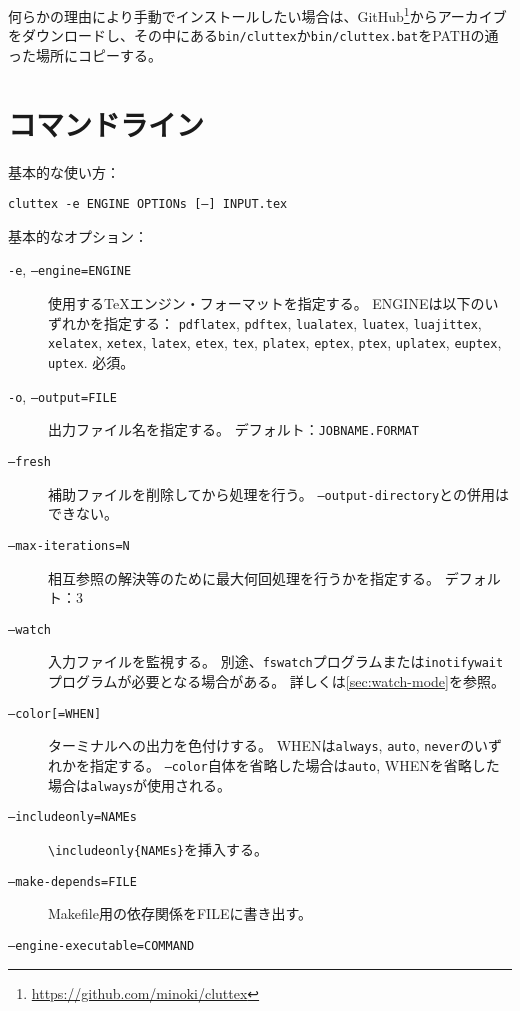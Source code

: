 \documentclass[a4paper]{ltjsreport}
\newcommand\texcmd[1]{\texttt{\textbackslash #1}}
\newcommand\metavar[1]{\textsf{#1}}
\begin{document}
何らかの理由により手動でインストールしたい場合は、GitHub\footnote{\url{https://github.com/minoki/cluttex}}からアーカイブをダウンロードし、その中にある\texttt{bin/cluttex}か\texttt{bin/cluttex.bat}をPATHの通った場所にコピーする。

\section{コマンドライン}
基本的な使い方：
\begin{center}
  \texttt{cluttex -e \metavar{ENGINE} \metavar{OPTIONs} [--] \metavar{INPUT}.tex}
\end{center}

基本的なオプション：
\begin{description}
\item[\texttt{-e}, \texttt{--engine=\metavar{ENGINE}}]
  使用する\TeX{}エンジン・フォーマットを指定する。
  \metavar{ENGINE}は以下のいずれかを指定する：
  \texttt{pdflatex}, \texttt{pdftex},
  \texttt{lualatex}, \texttt{luatex}, \texttt{luajittex},
  \texttt{xelatex}, \texttt{xetex},
  \texttt{latex}, \texttt{etex}, \texttt{tex},
  \texttt{platex}, \texttt{eptex}, \texttt{ptex},
  \texttt{uplatex}, \texttt{euptex}, \texttt{uptex}.
  必須。
\item[\texttt{-o}, \texttt{--output=\metavar{FILE}}]
  出力ファイル名を指定する。
  デフォルト：\texttt{\metavar{JOBNAME}.\metavar{FORMAT}}
\item[\texttt{--fresh}]
  補助ファイルを削除してから処理を行う。
  \texttt{--output-directory}との併用はできない。
\item[\texttt{--max-iterations=\metavar{N}}]
  相互参照の解決等のために最大何回処理を行うかを指定する。
  デフォルト：3
\item[\texttt{--watch}]
  入力ファイルを監視する。
  別途、\texttt{fswatch}プログラムまたは\texttt{inotifywait}プログラムが必要となる場合がある。
  詳しくは\cref{sec:watch-mode}を参照。
\item[\texttt{--color[=\metavar{WHEN}]}]
  ターミナルへの出力を色付けする。
  \metavar{WHEN}は\texttt{always}, \texttt{auto}, \texttt{never}のいずれかを指定する。
  \texttt{--color}自体を省略した場合は\texttt{auto}, \metavar{WHEN}を省略した場合は\texttt{always}が使用される。
\item[\texttt{--includeonly=\metavar{NAMEs}}]
  \texttt{\texcmd{includeonly}\{\metavar{NAMEs}\}}を挿入する。
\item[\texttt{--make-depends=\metavar{FILE}}]
  Makefile用の依存関係を\metavar{FILE}に書き出す。
\item[\texttt{--engine-executable=\metavar{COMMAND}}]

\end{description}
\end{document}

